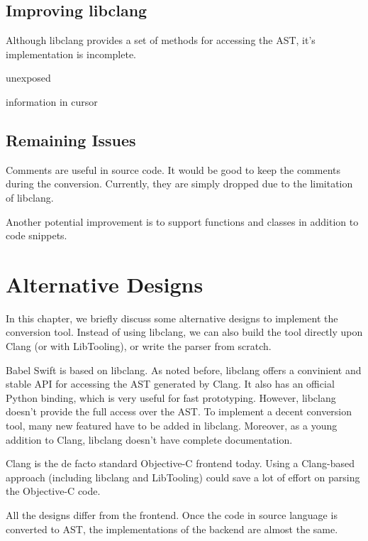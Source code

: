 \documentclass{sfuthesis}
\begin{document}



\section{Improving libclang}

Although libclang provides a set of methods for accessing the AST, it's implementation is incomplete.

unexposed

information in cursor


\section{Remaining Issues}

Comments are useful in source code. It would be good to keep the comments during the conversion. Currently, they are simply dropped due to the limitation of libclang. 

Another potential improvement is to support functions and classes in addition to code snippets.

\chapter{Alternative Designs}

In this chapter, we briefly discuss some alternative designs to implement the conversion tool. Instead of using libclang, we can also build the tool directly upon Clang (or with LibTooling), or write the parser from scratch.

Babel Swift is based on libclang. As noted before, libclang offers a convinient and stable API for accessing the AST generated by Clang. It also has an official Python binding, which is very useful for fast prototyping. However, libclang doesn't provide the full access over the AST. To implement a decent conversion tool, many new featured have to be added in libclang. Moreover, as a young addition to Clang, libclang doesn't have complete documentation.

Clang is the de facto standard Objective-C frontend today. Using a Clang-based approach (including libclang and LibTooling) could save a lot of effort on parsing the Objective-C code.

All the designs differ from the frontend. Once the code in source language is converted to AST, the implementations of the backend are almost the same.
\end{document}
